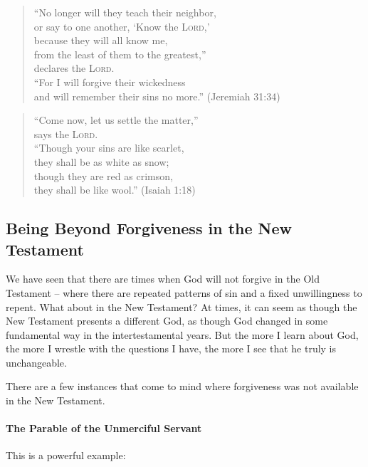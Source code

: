 \begin{quote}
    \enquote{No longer will they teach their neighbor,\\
    \VerseIndent or say to one another, \enquote{Know the \textsc{Lord},}\\
    because they will all know me,\\
    \VerseIndent from the least of them to the greatest,}\\
    \VerseIndent\VerseIndent declares the \textsc{Lord}.\\
    \enquote{For I will forgive their wickedness\\
    \VerseIndent and will remember their sins no more.} (Jeremiah 31:34)\\
\end{quote}

\begin{quote}
    \enquote{Come now, let us settle the matter,}\\
    \VerseIndent says the \textsc{Lord}.\\
    \enquote{Though your sins are like scarlet,\\
    \VerseIndent they shall be as white as snow;\\
    though they are red as crimson,\\
    \VerseIndent they shall be like wool.} (Isaiah 1:18)\\
\end{quote}
\NormalQuoteStyle

\subsection{Being Beyond Forgiveness in the New Testament}

We have seen that there are times when God will not forgive in the Old Testament
-- where there are repeated patterns of sin and a fixed unwillingness to repent.
What about in the New Testament? At times, it can seem as though the New
Testament presents a different God, as though God changed in some fundamental
way in the intertestamental years. But the more I learn about God, the more I
wrestle with the questions I have, the more I see that he truly is unchangeable.

There are a few instances that come to mind where forgiveness was not available
in the New Testament.

\paragraph{The Parable of the Unmerciful Servant} This is a powerful example:

